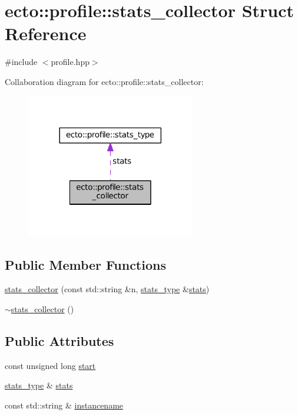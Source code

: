 \hypertarget{structecto_1_1profile_1_1stats__collector}{}\section{ecto\+:\+:profile\+:\+:stats\+\_\+collector Struct Reference}
\label{structecto_1_1profile_1_1stats__collector}


{\ttfamily \#include $<$profile.\+hpp$>$}



Collaboration diagram for ecto\+:\+:profile\+:\+:stats\+\_\+collector\+:\nopagebreak
\begin{figure}[H]
\begin{center}
\leavevmode
\includegraphics[width=209pt]{structecto_1_1profile_1_1stats__collector__coll__graph}
\end{center}
\end{figure}
\subsection*{Public Member Functions}
\begin{DoxyCompactItemize}
\item 
\hyperlink{structecto_1_1profile_1_1stats__collector_adae561b196f7ec50f42ba76031924ee4}{stats\+\_\+collector} (const std\+::string \&n, \hyperlink{structecto_1_1profile_1_1stats__type}{stats\+\_\+type} \&\hyperlink{structecto_1_1profile_1_1stats__collector_a2c206fb60ea04b5162ec43a609f2a185}{stats})
\item 
\hyperlink{structecto_1_1profile_1_1stats__collector_aa1521de3406025190b06d0b7bad33064}{$\sim$stats\+\_\+collector} ()
\end{DoxyCompactItemize}
\subsection*{Public Attributes}
\begin{DoxyCompactItemize}
\item 
const unsigned long \hyperlink{structecto_1_1profile_1_1stats__collector_ae607313a8ecc75d6a6ab201cdf7c2d61}{start}
\item 
\hyperlink{structecto_1_1profile_1_1stats__type}{stats\+\_\+type} \& \hyperlink{structecto_1_1profile_1_1stats__collector_a2c206fb60ea04b5162ec43a609f2a185}{stats}
\item 
const std\+::string \& \hyperlink{structecto_1_1profile_1_1stats__collector_ac3d5d7adf91b02719a6b897869683f03}{instancename}
\end{DoxyCompactItemize}


